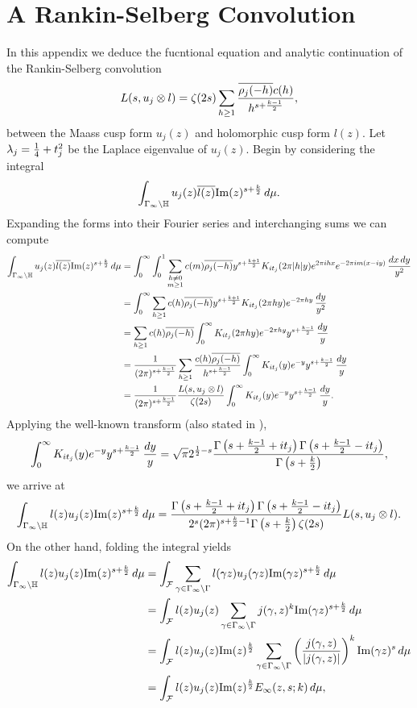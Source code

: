 \documentclass[12pt,reqno,oneside]{amsart}
\begin{document}
\section*{A Rankin-Selberg Convolution}
  In this appendix we deduce the fucntional equation and analytic continuation of the Rankin-Selberg convolution
  \[
    L(s,u_{j} \otimes l) = \zeta(2s)\sum_{h \ge 1}\frac{\overline{\rho_{j}(-h)}c(h)}{h^{s+\frac{k-1}{2}}},
  \]
  between the Maass cusp form $u_{j}(z)$ and holomorphic cusp form $l(z)$. Let $\lambda_{j} = \frac{1}{4}+t_{j}^{2}$ be the Laplace eigenvalue of $u_{j}(z)$. Begin by considering the integral
  \[
    \int_{\Gamma_{\infty}\backslash\mathbb{H}}u_{j}(z)\overline{l(z)}\mathrm{Im}(z)^{s+\frac{k}{2}}\,d\mu.
  \]
  Expanding the forms into their Fourier series and interchanging sums we can compute
  \begin{align*}
    \int_{\Gamma_{\infty}\backslash\mathbb{H}}u_{j}(z)\overline{l(z)}\mathrm{Im}(z)^{s+\frac{k}{2}}\,d\mu &= \int_{0}^{\infty}\int_{0}^{1}\sum_{\substack{h \neq 0 \\ m \ge 1}}c(m)\overline{\rho_{j}(-h)}y^{s+\frac{k+1}{2}}K_{it_{j}}(2\pi|h|y)e^{2\pi ihx}e^{-2\pi im(x-iy)}\,\frac{dx\,dy}{y^{2}} \\
    &= \int_{0}^{\infty}\sum_{h \ge 1}c(h)\overline{\rho_{j}(-h)}y^{s+\frac{k+1}{2}}K_{it_{j}}(2\pi hy)e^{-2\pi hy}\,\frac{dy}{y^{2}} \\
    &= \sum_{h \ge 1}c(h)\overline{\rho_{j}(-h)}\int_{0}^{\infty}K_{it_{j}}(2\pi hy)e^{-2\pi hy}y^{s+\frac{k-1}{2}}\,\frac{dy}{y} \\
    &= \frac{1}{(2\pi)^{s+\frac{k-1}{2}}}\sum_{h \ge 1}\frac{c(h)\overline{\rho_{j}(-h)}}{h^{s+\frac{k-1}{2}}}\int_{0}^{\infty}K_{it_{j}}(y)e^{-y}y^{s+\frac{k-1}{2}}\,\frac{dy}{y} \\
    &= \frac{1}{(2\pi)^{s+\frac{k-1}{2}}}\frac{L(s,u_{j} \otimes l)}{\zeta(2s)}\int_{0}^{\infty}K_{it_{j}}(y)e^{-y}y^{s+\frac{k-1}{2}}\,\frac{dy}{y}.
  \end{align*}
  Applying the well-known transform (also stated in \cite{HDL}),
  \[
    \int_{0}^{\infty}K_{it_{j}}(y)e^{-y}y^{s+\frac{k-1}{2}}\,\frac{dy}{y} = \sqrt{\pi}2^{\frac{1}{2}-s}\frac{\Gamma\left(s+\frac{k-1}{2}+it_{j}\right)\Gamma\left(s+\frac{k-1}{2}-it_{j}\right)}{\Gamma\left(s+\frac{k}{2}\right)},
  \]
  we arrive at
  \[
    \int_{\Gamma_{\infty}\backslash\mathbb{H}}l(z)u_{j}(z)\mathrm{Im}(z)^{s+\frac{k}{2}}\,d\mu = \frac{\Gamma\left(s+\frac{k-1}{2}+it_{j}\right)\Gamma\left(s+\frac{k-1}{2}-it_{j}\right)}{2^{s}(2\pi)^{s+\frac{k}{2}-1}\Gamma\left(s+\frac{k}{2}\right)\zeta(2s)}L(s,u_{j} \otimes l).
  \]
  On the other hand, folding the integral yields
  \begin{align*}
    \int_{\Gamma_{\infty}\backslash\mathbb{H}}l(z)u_{j}(z)\mathrm{Im}(z)^{s+\frac{k}{2}}\,d\mu &= \int_{\mathcal{F}}\sum_{\gamma \in \Gamma_{\infty}\backslash\Gamma}l(\gamma z)u_{j}(\gamma z)\mathrm{Im}(\gamma z)^{s+\frac{k}{2}}\,d\mu \\
    &= \int_{\mathcal{F}}l(z)u_{j}(z)\sum_{\gamma \in \Gamma_{\infty}\backslash\Gamma}j(\gamma,z)^{k}\mathrm{Im}(\gamma z)^{s+\frac{k}{2}}\,d\mu \\
    &= \int_{\mathcal{F}}l(z)u_{j}(z)\mathrm{Im}(z)^{\frac{k}{2}}\sum_{\gamma \in \Gamma_{\infty}\backslash\Gamma}\left(\frac{j(\gamma,z)}{|j(\gamma,z)|}\right)^{k}\mathrm{Im}(\gamma z)^{s}\,d\mu \\
    &= \int_{\mathcal{F}}l(z)u_{j}(z)\mathrm{Im}(z)^{\frac{k}{2}}E_{\infty}(z,s;k)\,d\mu,
  \end{align*}
\end{document}

